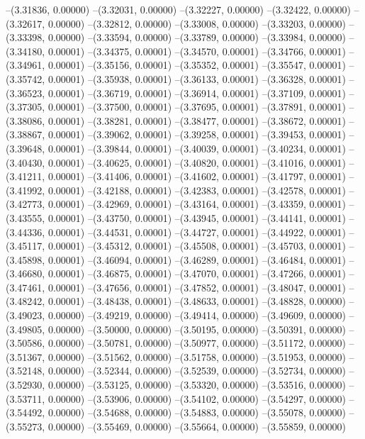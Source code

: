 --(3.31836, 0.00000)
--(3.32031, 0.00000)
--(3.32227, 0.00000)
--(3.32422, 0.00000)
--(3.32617, 0.00000)
--(3.32812, 0.00000)
--(3.33008, 0.00000)
--(3.33203, 0.00000)
--(3.33398, 0.00000)
--(3.33594, 0.00000)
--(3.33789, 0.00000)
--(3.33984, 0.00000)
--(3.34180, 0.00001)
--(3.34375, 0.00001)
--(3.34570, 0.00001)
--(3.34766, 0.00001)
--(3.34961, 0.00001)
--(3.35156, 0.00001)
--(3.35352, 0.00001)
--(3.35547, 0.00001)
--(3.35742, 0.00001)
--(3.35938, 0.00001)
--(3.36133, 0.00001)
--(3.36328, 0.00001)
--(3.36523, 0.00001)
--(3.36719, 0.00001)
--(3.36914, 0.00001)
--(3.37109, 0.00001)
--(3.37305, 0.00001)
--(3.37500, 0.00001)
--(3.37695, 0.00001)
--(3.37891, 0.00001)
--(3.38086, 0.00001)
--(3.38281, 0.00001)
--(3.38477, 0.00001)
--(3.38672, 0.00001)
--(3.38867, 0.00001)
--(3.39062, 0.00001)
--(3.39258, 0.00001)
--(3.39453, 0.00001)
--(3.39648, 0.00001)
--(3.39844, 0.00001)
--(3.40039, 0.00001)
--(3.40234, 0.00001)
--(3.40430, 0.00001)
--(3.40625, 0.00001)
--(3.40820, 0.00001)
--(3.41016, 0.00001)
--(3.41211, 0.00001)
--(3.41406, 0.00001)
--(3.41602, 0.00001)
--(3.41797, 0.00001)
--(3.41992, 0.00001)
--(3.42188, 0.00001)
--(3.42383, 0.00001)
--(3.42578, 0.00001)
--(3.42773, 0.00001)
--(3.42969, 0.00001)
--(3.43164, 0.00001)
--(3.43359, 0.00001)
--(3.43555, 0.00001)
--(3.43750, 0.00001)
--(3.43945, 0.00001)
--(3.44141, 0.00001)
--(3.44336, 0.00001)
--(3.44531, 0.00001)
--(3.44727, 0.00001)
--(3.44922, 0.00001)
--(3.45117, 0.00001)
--(3.45312, 0.00001)
--(3.45508, 0.00001)
--(3.45703, 0.00001)
--(3.45898, 0.00001)
--(3.46094, 0.00001)
--(3.46289, 0.00001)
--(3.46484, 0.00001)
--(3.46680, 0.00001)
--(3.46875, 0.00001)
--(3.47070, 0.00001)
--(3.47266, 0.00001)
--(3.47461, 0.00001)
--(3.47656, 0.00001)
--(3.47852, 0.00001)
--(3.48047, 0.00001)
--(3.48242, 0.00001)
--(3.48438, 0.00001)
--(3.48633, 0.00001)
--(3.48828, 0.00000)
--(3.49023, 0.00000)
--(3.49219, 0.00000)
--(3.49414, 0.00000)
--(3.49609, 0.00000)
--(3.49805, 0.00000)
--(3.50000, 0.00000)
--(3.50195, 0.00000)
--(3.50391, 0.00000)
--(3.50586, 0.00000)
--(3.50781, 0.00000)
--(3.50977, 0.00000)
--(3.51172, 0.00000)
--(3.51367, 0.00000)
--(3.51562, 0.00000)
--(3.51758, 0.00000)
--(3.51953, 0.00000)
--(3.52148, 0.00000)
--(3.52344, 0.00000)
--(3.52539, 0.00000)
--(3.52734, 0.00000)
--(3.52930, 0.00000)
--(3.53125, 0.00000)
--(3.53320, 0.00000)
--(3.53516, 0.00000)
--(3.53711, 0.00000)
--(3.53906, 0.00000)
--(3.54102, 0.00000)
--(3.54297, 0.00000)
--(3.54492, 0.00000)
--(3.54688, 0.00000)
--(3.54883, 0.00000)
--(3.55078, 0.00000)
--(3.55273, 0.00000)
--(3.55469, 0.00000)
--(3.55664, 0.00000)
--(3.55859, 0.00000)
